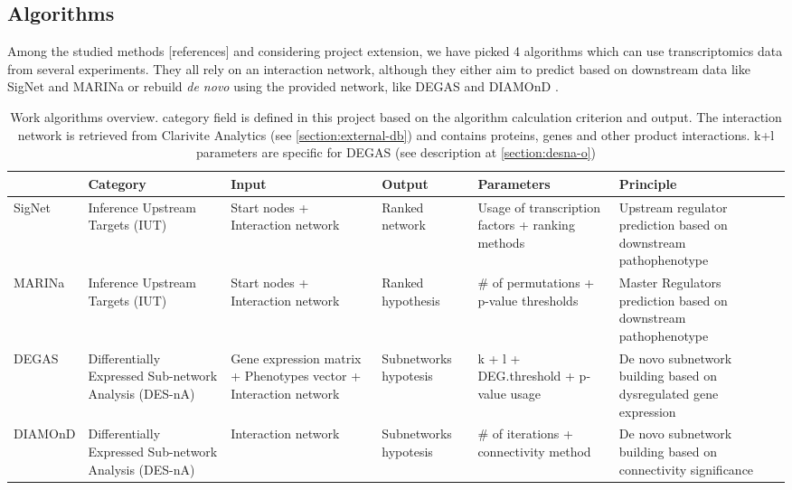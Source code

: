 \subsection{Algorithms}
Among the studied methods [references] and considering project extension, we have picked 4 algorithms which can use transcriptomics data from several experiments. They all rely on an interaction network, although they either aim to predict based on downstream data like SigNet \cite{Coker2017SiGNet:Inference} and MARINa \cite{Lefebvre2010ACenters}  or rebuild \textit{de novo} using the provided network, like DEGAS \cite{Ulitsky2010DEGAS:Diseases} and DIAMOnD \cite{Ghiassian2015AInteractome}.


\begin{table}[h]
\centering
\begin{tabularx}{\textwidth}{@{}lYYYYY@{}}
\hline
        & Category                                               & Input                                                            & Output                & Parameters                                       & Principle                                                         \\ \hline
SigNet  & Inference Upstream Targets (IUT)                       & Start nodes + Interaction network                                & Ranked network        & Usage of transcription factors + ranking methods & Upstream regulator prediction based on downstream pathophenotype  \\ \hline
MARINa  & Inference Upstream Targets (IUT)                       & Start nodes + Interaction network                                & Ranked hypothesis     & \# of permutations + p-value thresholds          & Master Regulators prediction based on downstream pathophenotype   \\ \hline
DEGAS   & Differentially Expressed Sub-network Analysis (DES-nA) & Gene expression matrix + Phenotypes vector + Interaction network & Subnetworks hypotesis & k + l + DEG.threshold + p-value usage            & De novo subnetwork building based on dysregulated gene expression \\ \hline
DIAMOnD & Differentially Expressed Sub-network Analysis (DES-nA) & Interaction network                                              & Subnetworks hypotesis & \# of iterations + connectivity method           & De novo subnetwork building based on connectivity significance    \\ \hline
\end{tabularx}%
\caption{Work algorithms overview. category field is defined in this project based on the algorithm calculation criterion and output. The interaction network is retrieved from Clarivite Analytics (see \ref{section:external-db}) and contains proteins, genes and other product interactions. k+l parameters are specific for DEGAS (see description at \ref{section:desna-o})}
\label{tbl:algorithms-overview}
\end{table}


